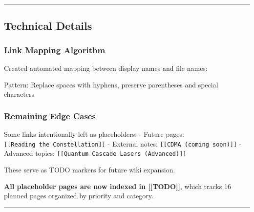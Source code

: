 \begin{center}\rule{0.5\linewidth}{0.5pt}\end{center}

\subsection{Technical Details}\label{technical-details}

\subsubsection{Link Mapping Algorithm}\label{link-mapping-algorithm}

Created automated mapping between display names and file names:

\begin{Shaded}
\begin{Highlighting}[]
\OperatorTok{=}\NormalTok{ \{}
    \NormalTok{: }\NormalTok{,}
    \NormalTok{: }\NormalTok{,}
\NormalTok{\}}
\end{Highlighting}
\end{Shaded}

Pattern: Replace spaces with hyphens, preserve parentheses and special
characters

\subsubsection{Remaining Edge Cases}\label{remaining-edge-cases}

Some links intentionally left as placeholders: - Future pages:
\texttt{{[}{[}Reading\ the\ Constellation{]}{]}} - External notes:
\texttt{{[}{[}CDMA\ (coming\ soon){]}{]}} - Advanced topics:
\texttt{{[}{[}Quantum\ Cascade\ Lasers\ (Advanced){]}{]}}

These serve as TODO markers for future wiki expansion.

\textbf{All placeholder pages are now indexed in {[}{[}TODO{]}{]}},
which tracks 16 planned pages organized by priority and category.

\begin{center}\rule{0.5\linewidth}{0.5pt}\end{center}

